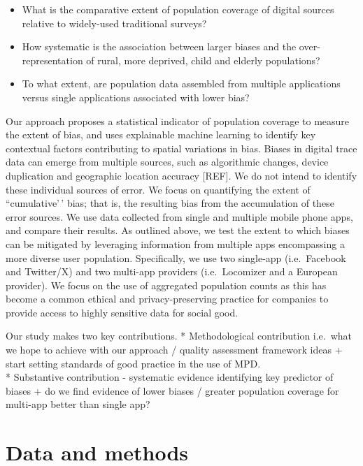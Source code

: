 \documentclass[]{rsos}%
\providecommand{\tightlist}{%
  \setlength{\itemsep}{0pt}\setlength{\parskip}{0pt}}
\begin{document}
\begin{itemize}
\tightlist
\item
  What is the comparative extent of population coverage of digital
  sources relative to widely-used traditional surveys?
\item
  How systematic is the association between larger biases and the
  over-representation of rural, more deprived, child and elderly
  populations?
\item
  To what extent, are population data assembled from multiple
  applications versus single applications associated with lower bias?
\end{itemize}

Our approach proposes a statistical indicator of population coverage to
measure the extent of bias, and uses explainable machine learning to
identify key contextual factors contributing to spatial variations in
bias. Biases in digital trace data can emerge from multiple sources,
such as algorithmic changes, device duplication and geographic location
accuracy {[}REF{]}. We do not intend to identify these individual sources of
error. We focus on quantifying the extent of ``cumulative'\,' bias; that
is, the resulting bias from the accumulation of these error sources. We
use data collected from single and multiple mobile phone apps, and
compare their results. As outlined above, we test the extent to which
biases can be mitigated by leveraging information from multiple apps
encompassing a more diverse user population. Specifically, we use two
single-app (i.e.~Facebook and Twitter/X) and two multi-app providers
(i.e.~Locomizer and a European provider). We focus on the use of
aggregated population counts as this has become a common ethical and
privacy-preserving practice for companies to provide access to highly
sensitive data for social good.

Our study makes two key contributions. * Methodological contribution
i.e.~what we hope to achieve with our approach / quality assessment
framework ideas + start setting standards of good practice in the use of
MPD.\\
* Substantive contribution - systematic evidence identifying key
predictor of biases + do we find evidence of lower biases / greater
population coverage for multi-app better than single app?

\section{Data and methods}\label{data-and-methods}
\end{document}
